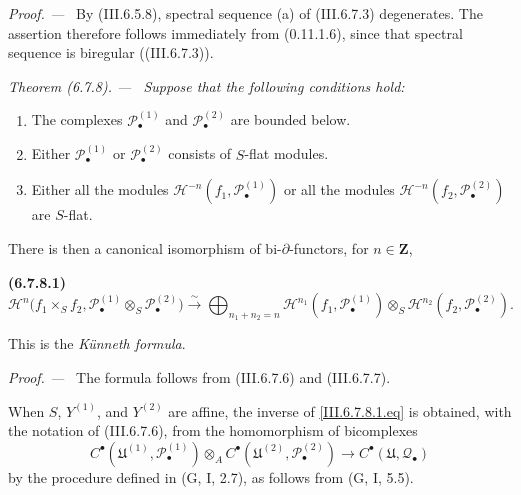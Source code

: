 \documentclass[10pt,oneside]{book}
\newcommand{\sh}[1]{\mathscr{#1}}
\newcommand{\sref}[2][]{(#2)}
\newcommand{\oldpage}[2][]{\setcounter{footnote}{0}\marginpar{\scriptsize\textbf{#1}~|~#2}\ignorespaces}
\newenvironment{env}[1][]{\par\medskip\noindent\textbf{(#1)}\ }{\par}
\newenvironment{theorem}[1][]{\par\medskip\noindent\itshape Theorem (#1). ---\ }{\par}
\newenvironment{proof}{\par\medskip\noindent\textit{Proof. ---\ }}{\par}
\begin{document}
\begin{proof}
By \sref{III.6.5.8}, spectral sequence \textnormal{(a)} of
\sref{III.6.7.3} degenerates.  The assertion therefore follows
immediately from \sref[0]{0.11.1.6}, since that spectral sequence
is biregular (\sref{III.6.7.3}).
\end{proof}

\begin{theorem}[6.7.8]
\label{III.6.7.8}
Suppose that the following conditions hold:
\begin{enumerate}
  \item[{$1^\circ$}]
    The complexes $\sh P_\bullet^{(1)}$ and
    $\sh P_\bullet^{(2)}$ are bounded below.
  \item[{$2^\circ$}]
    Either $\sh P_\bullet^{(1)}$ or
    $\sh P_\bullet^{(2)}$ consists of $S$-flat modules.

    \oldpage[III]{162}

  \item[{$3^\circ$}]
    Either all the modules
    $\sh H^{-n}(f_1,\sh P_\bullet^{(1)})$ or all the modules
    $\sh H^{-n}(f_2,\sh P_\bullet^{(2)})$ are $S$-flat.
\end{enumerate}
There is then a canonical isomorphism of bi-$\partial$-functors,
for $n\in\mathbf Z$,
\begin{env}[6.7.8.1]
\label{III.6.7.8.1}
\[
  \sh H^n
  \bigl(
    f_1\times_Sf_2,
    \sh P_\bullet^{(1)}\otimes_S\sh P_\bullet^{(2)}
  \bigr)
  \xrightarrow{\sim}
  \bigoplus_{n_1+n_2=n}
  \sh H^{n_1}(f_1,\sh P_\bullet^{(1)})
  \otimes_S
  \sh H^{n_2}(f_2,\sh P_\bullet^{(2)}).
  \tag{6.7.8.1}\label{III.6.7.8.1.eq}
\]
\end{env}
This is the \emph{K\"unneth formula}.
\end{theorem}

\begin{proof}
The formula follows from \sref{III.6.7.6} and
\sref{III.6.7.7}.

When $S$, $Y^{(1)}$, and $Y^{(2)}$ are affine, the inverse of
\eqref{III.6.7.8.1.eq} is obtained, with the notation of
\sref{III.6.7.6}, from the homomorphism of bicomplexes
\[
  C^\bullet(\mathfrak U^{(1)},\sh P_\bullet^{(1)})
  \otimes_A
  C^\bullet(\mathfrak U^{(2)},\sh P_\bullet^{(2)})
  \longrightarrow
  C^\bullet(\mathfrak U,\sh Q_\bullet)
\]
by the procedure defined in \textnormal{(G, I, 2.7)}, as follows
from \textnormal{(G, I, 5.5)}.
\end{proof}
\end{document}
